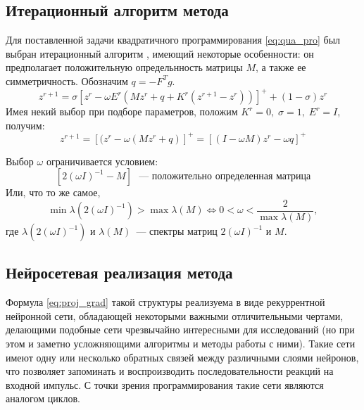 \documentclass[a4paper, 12pt]{article}
\begin{document}
\subsection{Итерационный алгоритм метода}
Для поставленной задачи квадратичного программирования \eqref{eq:qua_pro} был выбран итерационный алгоритм \cite{LCP}, имеющий некоторые особенности: он предполагает положительную определьнность матрицы $M$, а также ее симметричность. Обозначим $q = - F^T g$.
$$
        z^{r+1} = \sigma [z^r - \omega E^r (M z^r + q + K^r(z^{r+1} - z^r))]^+ +(1 - \sigma ) z^r
    $$
    Имея некий выбор при подборе параметров, положим $K^r = 0, \; \sigma = 1, \; E^r = I$, получим: 
    \begin{equation}\label{eq:proj_grad}
    z^{r+1} =[(z^r - \omega (M z^r + q)]^+ = [(I - \omega M) z^r - \omega q]^+ 
    \end{equation}
        
Выбор $\omega$ ограничивается условием:
    $$[2 (\omega I)^{-1} - M] \mbox{ ~--- положительно определенная матрица}$$
    Или, что то же самое, $$\min\lambda(2 (\omega I)^{-1}) > \max\lambda (M) \Leftrightarrow 0 < \omega < \frac{2}{\max\lambda(M)},$$
    где $\lambda(2 (\omega I)^{-1})$ и $\lambda(M)$~--- спектры матриц $2 (\omega I)^{-1}$ и $M$.
    
\subsection{Нейросетевая реализация метода}
Формула \eqref{eq:proj_grad} такой структуры реализуема в виде рекуррентной нейронной сети, обладающей некоторыми важными отличительными чертами, делающими подобные сети чрезвычайно интересными для исследований (но при этом и заметно усложняющими алгоритмы и методы работы с ними). Такие сети имеют одну или несколько обратных связей между различными слоями нейронов, что позволяет запоминать и воспроизводить последовательности реакций на входной импульс. С точки зрения программирования такие сети являются аналогом циклов.
\end{document}
